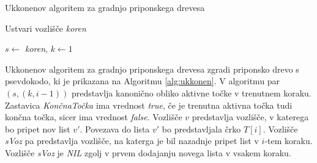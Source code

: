 \begin{algorithm}[tb]

    \caption{Ukkonenov algoritem za gradnjo priponskega drevesa}\label{alg:ukkonen}
    {
        {Ustvari vozlišče \textit{koren}}
        
        {$s\leftarrow$ \textit{koren}, $k\leftarrow 1$}
        
        
    }
\end{algorithm}

Ukkonenov algoritem za gradnjo priponskega drevesa zgradi priponsko drevo s psevdokodo, ki je prikazana na Algoritmu \ref{alg:ukkonen}.
V algoritmu par $(s, (k,i-1))$ predstavlja kanonično obliko aktivne točke v trenutnem koraku. Zastavica \textit{KončnaTočka} ima vrednost \textit{true}, če je trenutna aktivna točka tudi končna točka, sicer ima vrednost \textit{false}. Vozlišče $v$ predstavlja vozlišče, v katerega bo pripet nov list $v'$. Povezava do lista $v'$ bo predstavljala črko $T[i]$. Vozlišče \textit{sVoz} pa predstavlja vozlišče, na katerga je bil nazadnje pripet list v $i$-tem koraku. Vozlišče \textit{sVoz} je \textit{NIL} zgolj v prvem dodajanju novega lista v vsakem koraku.



